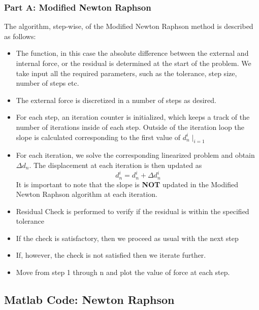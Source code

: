 \documentclass[11pt]{article}
\begin{document}
\subsubsection*{Part A:  Modified Newton Raphson}
The algorithm, step-wise, of the Modified Newton Raphson method is described as follows: 
\begin{itemize}
\item The function, in this case the absolute difference between the external and internal force, or the residual is determined at the start of the problem. We take input all the required parameters, such as the tolerance, step size, number of steps etc.
\item The external force is discretized in a number of steps as desired. 
\item For each step, an iteration counter is initialized, which keeps a track of the number of iterations inside of each step. Outside of the iteration loop the slope is calculated corresponding to the first value of $d_n^i \mid_{i=1}$
\item For each iteration, we solve the corresponding linearized problem and obtain $\Delta d_{n}$. The displacement at each iteration is then updated as $$d_n^i = d_n^i + \Delta d_n^i$$It is important to note that the slope is {\bf NOT} updated in the Modified Newton Raphson algorithm at each iteration.
\item Residual Check is performed to verify if the residual is within the specified tolerance
\item If the check is satisfactory, then we proceed as usual with the next step
\item If, however, the check is not satisfied then we iterate further. 
\item Move from step 1 through n and plot the value of force at each step. 
\end{itemize}
\subsection*{Matlab Code: Newton Raphson}

\end{document}
